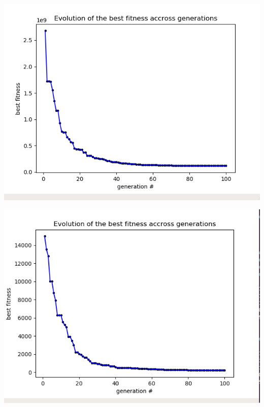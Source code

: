 \documentclass[12pt]{article}
\begin{document}
				\begin{minipage}{0.6\linewidth}
					\includegraphics[width=\linewidth]{15.png}
				\end{minipage}
				\hfill
				\begin{minipage}{0.6\linewidth}
					\includegraphics[width=\linewidth]{16.png}
				\end{minipage}
\end{document}
